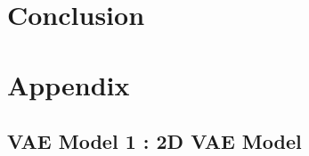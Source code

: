 \documentclass{article}
\begin{document}
\newpage{}
\section{Conclusion}

\newpage{}
\section{Appendix}
\subsection{VAE Model 1 : 2D VAE Model}








\newpage{}


\end{document}
